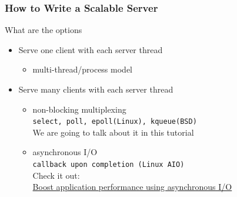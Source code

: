 \documentclass[aspectratio=43]{beamer}
\begin{document}
\begin{frame}
 \partpage
\end{frame}
\begin{frame}
  \frametitle{How to Write a Scalable Server}
\hspace*{2em} \begin{minipage}{.8\textwidth}
What are the options
\begin{itemize}
\item Serve one client with each server thread
\begin{itemize}
\item multi-thread/process model
\end{itemize}
\vspace{0.5em}
\item Serve many clients with each server thread
\begin{itemize}
\item non-blocking multiplexing \\
{\footnotesize \tt select, poll, epoll(Linux), kqueue(BSD)} \\
{\footnotesize We are going to talk about it in this tutorial}\\[0.5em]

\item asynchronous I/O\\
{\footnotesize \tt callback upon completion (Linux AIO) }\\
{\footnotesize Check it out:\\ \href{http://www.ibm.com/developerworks/linux/library/l-async/}{Boost application performance using asynchronous I/O}}
{\scriptsize }
\end{itemize}
\end{itemize}
\end{minipage}
\end{frame}
\end{document}
